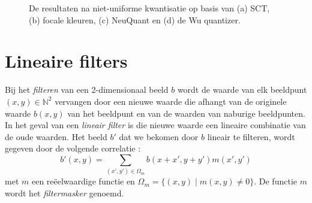 \begin{figure}[tbp]
\begin{center}
\caption{\label{fig:kwantistatie_niet-uniform}De resultaten na niet-uniforme kwantisatie op basis van (a) SCT, (b) focale kleuren, (c) NeuQuant en (d) de Wu quantizer.}
\end{center}
\end{figure}

\section{Lineaire filters}

Bij het \emph{filteren} van een 2-dimensionaal beeld $b$ wordt de waarde van elk beeldpunt $(x,y) \in \mathbb{N}^2$ 
vervangen door een nieuwe waarde die afhangt van de originele waarde $b(x,y)$ van het beeldpunt en van de waarden 
van naburige beeldpunten. In het geval van een \emph{lineair filter} is die nieuwe waarde een lineaire combinatie 
van de oude waarden. Het beeld $b'$ dat we bekomen door $b$ lineair te filteren, wordt gegeven door
de volgende correlatie \cite{philips:beeldverwerking}:
$$
b'(x,y) = \sum_{(x',y') \in \Omega_m} b(x+x',y+y')m(x',y')
$$
met $m$ een re\"eelwaardige functie en $\Omega_m = \{ (x,y) \mid m(x,y) \ne 0 \}$. De functie $m$ wordt
het \emph{filtermasker} genoemd.

